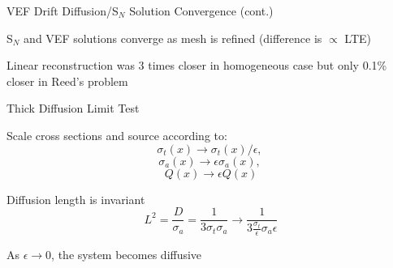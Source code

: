 \documentclass[10pt]{beamer}
\newcommand{\SN}{S$_N$\xspace}
\begin{document}
\begin{frame}{VEF Drift Diffusion/\SN Solution Convergence (cont.)}
	\pause
	\vspace{-.15in}

	\SN and VEF solutions converge as mesh is refined (difference is $\propto$ LTE)

	\pause
	Linear reconstruction was 3 times closer in homogeneous case but only 0.1\% closer in Reed's problem 

\end{frame}

\begin{frame}{Thick Diffusion Limit Test}

	Scale cross sections and source according to:
	$$ \sigma_t(x) \rightarrow \sigma_t(x)/\epsilon, \ $$
	$$ \sigma_a(x) \rightarrow \epsilon \sigma_a(x), \ $$
	$$ Q(x) \rightarrow \epsilon Q(x) $$

	Diffusion length is invariant 
	\begin{equation*}
		L^2 = \frac{D}{\sigma_a} = \frac{1}{3\sigma_t\sigma_a} \rightarrow
			\frac{1}{3 \frac{\sigma_t}{\epsilon} \sigma_a \epsilon}
	\end{equation*}

	As $\epsilon \rightarrow 0$, the system becomes diffusive 

\end{frame}
\end{document}
